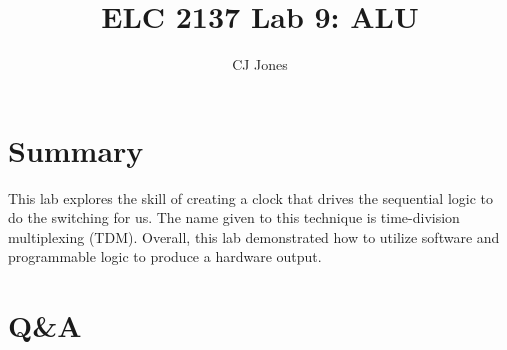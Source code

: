 \documentclass[11pt]{article}
\begin{document}
\title{ELC 2137 Lab 9: ALU}
\author{CJ Jones}

\maketitle


\section*{Summary}

This lab explores the skill of creating a clock that drives the sequential logic to do the switching for us. The name given to this technique is time-division multiplexing (TDM). Overall, this lab demonstrated how to utilize software and programmable logic to produce a hardware output.


\section*{Q\&A}
\end{document}
